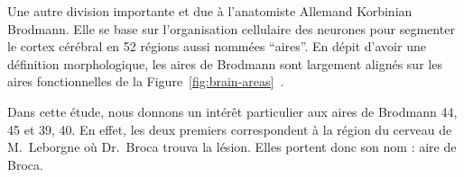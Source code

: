 Une autre division importante et due à l'anatomiste Allemand Korbinian Brodmann.
Elle se base sur l'organisation cellulaire des neurones pour segmenter le cortex cérébral en 52 régions 
aussi nommées ``aires''.
En dépit d'avoir une définition morphologique, 
les aires de Brodmann sont largement alignés sur les aires fonctionnelles 
de la Figure~\ref{fig:brain-areas}~\cite{Brodmann_2007}.

Dans cette étude, nous donnons un intérêt particulier aux aires de Brodmann 44, 45 et 39, 40.
En effet, les deux premiers correspondent à la région du cerveau de M.~Leborgne où Dr.~Broca trouva la lésion.
Elles portent donc son nom : aire de Broca.